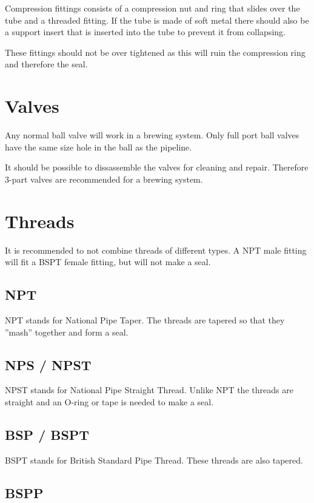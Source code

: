 \documentclass[11pt,fleqn,openany]{book} %
\begin{document}
Compression fittings consists of a compression nut and ring that slides over the tube and a threaded fitting. If the tube is made of soft metal there should also be a support insert that is inserted into the tube to prevent it from collapsing.

These fittings should not be over tightened as this will ruin the compression ring and therefore the seal.

\section{Valves}

Any normal ball valve will work in a brewing system. Only full port ball valves have the same size hole in the ball as the pipeline.

It should be possible to dissassemble the valves for cleaning and repair. Therefore 3-part valves are recommended for a brewing system.

\section{Threads}

It is recommended to not combine threads of different types. A NPT male fitting will fit a BSPT female fitting, but will not make a seal.

\subsection{NPT}

NPT stands for National Pipe Taper. The threads are tapered so that they ''mash'' together and form a seal.

\subsection{NPS / NPST}

NPST stands for National Pipe Straight Thread. Unlike NPT the threads are straight and an O-ring or tape is needed to make a seal.

\subsection{BSP / BSPT}

BSPT stands for British Standard Pipe Thread. These threads are also tapered.

\subsection{BSPP}
\end{document}
